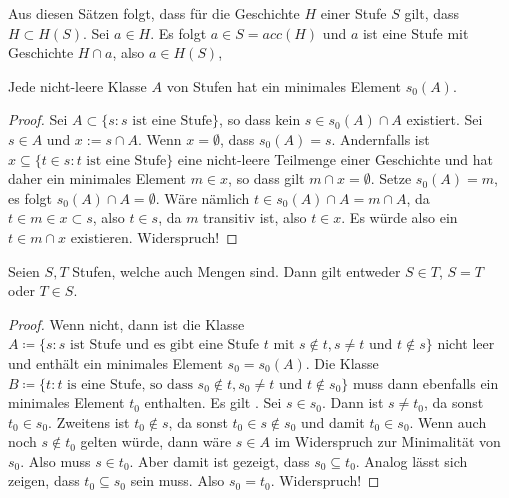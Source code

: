Aus diesen Sätzen folgt, dass für die Geschichte $H$ einer Stufe $S$ gilt, dass $H \subset H(S)$. Sei $a\in H$. Es folgt $a\in S=acc(H)$ und $a$ ist eine Stufe mit Geschichte $H\cap a$, also $a\in H(S)$,

\begin{satz}
	Jede nicht-leere Klasse $A$ von Stufen hat ein minimales Element $s_0(A)$.
\end{satz}
\begin{proof}
	Sei $A\subset\{s : s \text{ ist eine Stufe}\}$, so dass kein $s\in s_0(A)\cap A$ existiert. Sei $s\in A$ und $x:=s\cap A$. Wenn $x=\emptyset$, dass $s_0(A)=s$. 
	Andernfalls ist $x\subseteq\{t \in s : t \text{ ist eine Stufe}\}$ eine nicht-leere Teilmenge einer Geschichte und hat daher ein minimales Element $m\in x$, so dass gilt $m\cap x = \emptyset$. 
	Setze $s_0(A)=m$, es folgt $s_0(A)\cap A=\emptyset$. Wäre nämlich $t \in s_0(A)\cap A=m\cap A$, da $t\in m \in x \subset s$, also $t \in s$, da $m$ transitiv ist, also $t\in x$. Es würde also ein $t\in m\cap x$ existieren. Widerspruch!
\end{proof}

\begin{satz}
	Seien $S, T$ Stufen, welche auch Mengen sind. Dann gilt entweder $S\in T$, $S=T$ oder $T \in S$.
\end{satz}
\begin{proof}
	Wenn nicht, dann ist die Klasse $A\coloneqq\{s : s \text{ ist Stufe und es gibt eine Stufe } t \text{ mit } s \notin t, s\neq t \text{ und } t \notin s\}$ nicht leer und enthält ein minimales Element $s_0=s_0(A)$. 
	Die Klasse $B\coloneqq\{t : t \text{ is eine Stufe, so dass } s_0 \notin t, s_0\neq t \text{ und } t \notin s_0\}$ muss dann ebenfalls ein minimales Element $t_0$ enthalten.
	Es gilt .
	Sei $s\in s_0$. Dann ist $s\neq t_0$, da sonst $t_0\in s_0$.
	Zweitens ist $t_0 \notin s$, da sonst $t_0\in s \notin s_0$ und damit $t_0\in s_0$.
	Wenn auch noch $s\notin t_0$ gelten würde, dann wäre $s\in A$ im Widerspruch zur Minimalität von $s_0$. Also muss $s\in t_0$. Aber damit ist gezeigt, dass $s_0\subseteq t_0$. Analog lässt sich zeigen, dass $t_0\subseteq s_0$ sein muss. Also $s_0=t_0$. Widerspruch!
\end{proof}

